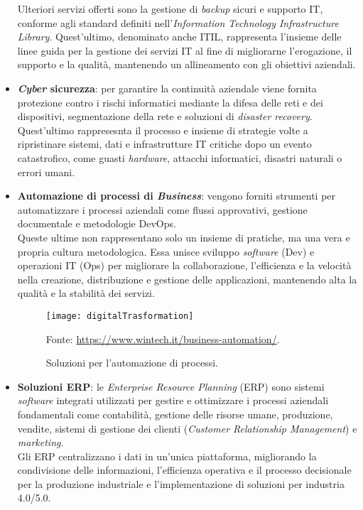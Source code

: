 \begin{itemize}
    Ulteriori servizi offerti sono la gestione di \emph{backup} sicuri e supporto \gls{IT}, conforme agli standard definiti nell'\emph{Information Technology Infrastructure Library}. Quest'ultimo, denominato anche ITIL, rappresenta l'insieme delle linee guida per la gestione dei servizi \gls{IT} al fine di migliorarne l'erogazione, il supporto e la qualità, mantenendo un allineamento con gli obiettivi aziendali.\\ 
    \item \textbf{\emph{Cyber} sicurezza}: per garantire la continuità aziendale viene fornita protezione contro i rischi informatici mediante la difesa delle reti e dei dispositivi, segmentazione della rete e soluzioni di \emph{disaster recovery}. Quest'ultimo rappresesnta il processo e insieme di strategie volte a ripristinare sistemi, dati e infrastrutture \gls{IT} critiche dopo un evento catastrofico, come guasti \emph{hardware}, attacchi informatici, disastri naturali o errori umani.\\
	\item \textbf{Automazione di processi di \emph{Business}}: vengono forniti strumenti per automatizzare i processi aziendali come flussi approvativi, gestione documentale e metodologie \gls{DevOps}.\\
    Queste ultime non rappresentano solo un insieme di pratiche, ma una vera e propria cultura metodologica. Essa unisce sviluppo \emph{software} (Dev) e operazioni \gls{IT} (Ops) per migliorare la collaborazione, l'efficienza e la velocità nella creazione, distribuzione e gestione delle applicazioni, mantenendo alta la qualità e la stabilità dei servizi.
	\begin{figure}[htbp] 
        \centering 
        \texttt{[image: digitalTrasformation]}
        \caption{Soluzioni per l'automazione di processi.} 
        \label{fig:digitalTransformation}
        Fonte: \url{https://www.wintech.it/business-automation/}.
    \end{figure}
    \item \textbf{Soluzioni ERP}: le \emph{Enterprise Resource Planning} (ERP) sono sistemi \emph{software} integrati utilizzati per gestire e ottimizzare i processi aziendali fondamentali come contabilità, gestione delle risorse umane, produzione, vendite, sistemi di gestione dei clienti (\emph{Customer Relationship Management}) e \emph{marketing}.\\
    Gli ERP centralizzano i dati in un'unica piattaforma, migliorando la condivisione delle informazioni, l'efficienza operativa e il processo decisionale per la produzione industriale e l'implementazione di soluzioni per industria 4.0/5.0.\\
\end{itemize}
